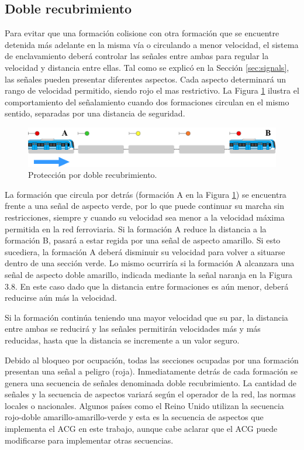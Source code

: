 \subsection{Doble recubrimiento}
	\label{sec:function_5}
	
	Para evitar que una formación colisione con otra formación que se encuentre detenida más adelante en la misma vía o circulando a menor velocidad, el sistema de enclavamiento deberá controlar las señales entre ambas para regular la velocidad y distancia entre ellas. Tal como se explicó en la Sección \ref{sec:signals}, las señales pueden presentar diferentes aspectos. Cada aspecto determinará un rango de velocidad permitido, siendo rojo el mas restrictivo. La Figura \ref{fig:ACG_recrubrimiento_1} ilustra el comportamiento del señalamiento cuando dos formaciones circulan en el mismo sentido, separadas por una distancia de seguridad.
	
	\begin{figure}[!h]
		\centering
		\includegraphics[width=1\textwidth]{Figuras/recubrimiento}
		\centering\caption{Protección por doble recubrimiento.}
		\label{fig:ACG_recrubrimiento_1}
	\end{figure}
	
	La formación que circula por detrás (formación A en la Figura \ref{fig:ACG_recrubrimiento_1}) se encuentra frente a una señal de aspecto verde, por lo
	que puede continuar su marcha sin restricciones, siempre y cuando su velocidad sea menor a la velocidad máxima permitida en la red ferroviaria. Si la formación A reduce la distancia a la formación B, pasará a estar regida por una señal de aspecto amarillo. Si esto sucediera, la formación A deberá disminuir su velocidad para volver a situarse dentro de una sección verde. Lo mismo ocurriría si la formación A alcanzara una señal de aspecto doble amarillo, indicada mediante la señal naranja en la Figura 3.8. En este caso dado que la distancia entre formaciones es aún menor, deberá reducirse aún más la velocidad.
	
	Si la formación continúa teniendo una mayor velocidad que su par, la distancia entre ambas se reducirá y las señales permitirán velocidades más y más reducidas, hasta que la distancia se incremente a un valor seguro.
	
	Debido al bloqueo por ocupación, todas las secciones ocupadas por una formación presentan una señal a peligro (roja). Inmediatamente detrás de cada formación se genera una secuencia de señales denominada doble recubrimiento. La cantidad de señales y la secuencia de aspectos variará según el operador de la red, las normas locales o nacionales. Algunos países como el Reino Unido \cite{UK} utilizan la secuencia rojo-doble amarillo-amarillo-verde y esta es la secuencia de aspectos que implementa el ACG en este trabajo, aunque cabe aclarar que el ACG puede modificarse para implementar otras secuencias. 
	
